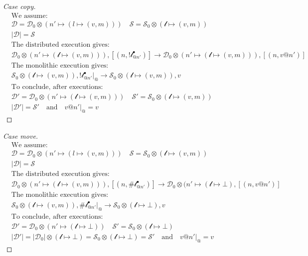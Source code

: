 \begin{proof}[Case copy]
    \begin{align*}
    &\text{We assume:}\\
    &\mathcal{D} = \mathcal{D}_0 \otimes (n' \mapsto (l\mapsto (v, m)))\quad
    \mathcal{S} = \mathcal{S}_0 \otimes (\mathscr{l} \mapsto (v, m))\\
    &|\mathcal{D}| = \mathcal{S}\\
    &\text{The distributed execution gives:}\\
    &\mathcal{D}_0 \otimes (n' \mapsto (\mathscr{l} \mapsto (v,m))) , [(n, !\mathscr{l}^\bullet_{@n'})] \longrightarrow \mathcal{D}_0 \otimes (n' \mapsto (\mathscr{l} \mapsto (v, m))), [(n, v@n')]\\
    &\text{The monolithic execution gives:}\\
    &\mathcal{S}_0 \otimes (\mathscr{l} \mapsto (v, m)), !\mathscr{l}^\bullet_{@n'}|_@ \longrightarrow \mathcal{S}_0 \otimes (\mathscr{l} \mapsto (v, m)), v\\
    &\text{To conclude, after executions:}\\
    &\mathcal{D}' = \mathcal{D}_0 \otimes (n' \mapsto (\mathscr{l} \mapsto (v, m))) \quad 
    \mathcal{S}' = \mathcal{S}_0 \otimes (\mathscr{l} \mapsto (v, m))\\
    &|\mathcal{D}'| = \mathcal{S}' \quad \text{and} \quad v@n'|_@ = v
    \end{align*}
\end{proof}
\begin{proof}[Case move]
    \begin{align*}
    &\text{We assume:}\\
    &\mathcal{D} = \mathcal{D}_0 \otimes (n' \mapsto (l\mapsto (v, m)))\quad
    \mathcal{S} = \mathcal{S}_0 \otimes (\mathscr{l} \mapsto (v, m))\\
    &|\mathcal{D}| = \mathcal{S}\\
    &\text{The distributed execution gives:}\\
    &\mathcal{D}_0 \otimes (n' \mapsto (\mathscr{l} \mapsto (v,m))) , [(n, \#\mathscr{l}^\bullet_{@n'})] \longrightarrow \mathcal{D}_0 \otimes (n' \mapsto (\mathscr{l} \mapsto \bot), [(n, v@n')]\\
    &\text{The monolithic execution gives:}\\
    &\mathcal{S}_0 \otimes (\mathscr{l} \mapsto (v, m)), \#\mathscr{l}^\bullet_{@n'}|_@ \longrightarrow \mathcal{S}_0 \otimes (\mathscr{l} \mapsto \bot), v\\
    &\text{To conclude, after executions:}\\
    &\mathcal{D}' = \mathcal{D}_0 \otimes (n' \mapsto (\mathscr{l} \mapsto \bot)) \quad 
    \mathcal{S}' = \mathcal{S}_0 \otimes (\mathscr{l} \mapsto \bot)\\
    &|\mathcal{D}'| = |\mathcal{D}_0| \otimes (\mathscr{l} \mapsto \bot) = \mathcal{S}_0 \otimes (\mathscr{l} \mapsto \bot) = \mathcal{S}' \quad \text{and} \quad v@n'|_@ = v
    \end{align*}
\end{proof}
